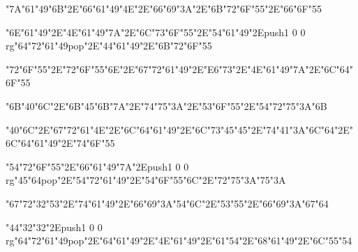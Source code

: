 \vfill\eject
\null\vfill
\centerline{\ipa\char"7A\ipa\char"61\ipa\char"49\ipa\char"6B\ipa\char"2E\ipa\char"66\ipa\char"61\ipa\char"49\ipa\char"4E\ipa\char"2E\ipa\char"66\ipa\char"69\ipa\char"3A\ipa\char"2E\ipa\char"6B\ipa\char"72\ipa\char"6F\ipa\char"55\ipa\char"2E\ipa\char"66\ipa\char"6F\ipa\char"55}\bigskip
\centerline{\ipa\char"6E\ipa\char"61\ipa\char"49\ipa\char"2E\ipa\char"4E\ipa\char"61\ipa\char"49\ipa\char"7A\ipa\char"2E\ipa\char"6C\ipa\char"73\ipa\char"6F\ipa\char"55\ipa\char"2E\ipa\char"54\ipa\char"61\ipa\char"49\ipa\char"2E\pdfcolorstack\match push{1 0 0 rg}\ipa\char"64\ipa\char"72\ipa\char"61\ipa\char"49\pdfcolorstack\match pop{}\ipa\char"2E\ipa\char"44\ipa\char"61\ipa\char"49\ipa\char"2E\ipa\char"6B\ipa\char"72\ipa\char"6F\ipa\char"55}\bigskip
\centerline{\ipa\char"72\ipa\char"6F\ipa\char"55\ipa\char"2E\ipa\char"72\ipa\char"6F\ipa\char"55\ipa\char"6E\ipa\char"2E\ipa\char"67\ipa\char"72\ipa\char"61\ipa\char"49\ipa\char"2E\ipa\char"E6\ipa\char"73\ipa\char"2E\ipa\char"4E\ipa\char"61\ipa\char"49\ipa\char"7A\ipa\char"2E\ipa\char"6C\ipa\char"64\ipa\char"6F\ipa\char"55}
\vfill\eject
\null\vfill
\centerline{\ipa\char"6B\ipa\char"40\ipa\char"6C\ipa\char"2E\ipa\char"6B\ipa\char"45\ipa\char"6B\ipa\char"7A\ipa\char"2E\ipa\char"74\ipa\char"75\ipa\char"3A\ipa\char"2E\ipa\char"53\ipa\char"6F\ipa\char"55\ipa\char"2E\ipa\char"54\ipa\char"72\ipa\char"75\ipa\char"3A\ipa\char"6B}\bigskip
\centerline{\ipa\char"40\ipa\char"6C\ipa\char"2E\ipa\char"67\ipa\char"72\ipa\char"61\ipa\char"4E\ipa\char"2E\ipa\char"6C\ipa\char"64\ipa\char"61\ipa\char"49\ipa\char"2E\ipa\char"6C\ipa\char"73\ipa\char"45\ipa\char"45\ipa\char"2E\ipa\char"74\ipa\char"41\ipa\char"3A\ipa\char"6C\ipa\char"64\ipa\char"2E\ipa\char"6C\ipa\char"64\ipa\char"61\ipa\char"49\ipa\char"2E\ipa\char"74\ipa\char"6F\ipa\char"55}\bigskip
\centerline{\ipa\char"54\ipa\char"72\ipa\char"6F\ipa\char"55\ipa\char"2E\ipa\char"66\ipa\char"61\ipa\char"49\ipa\char"7A\ipa\char"2E\pdfcolorstack\match push{1 0 0 rg}\ipa\char"45\ipa\char"64\pdfcolorstack\match pop{}\ipa\char"2E\ipa\char"54\ipa\char"72\ipa\char"61\ipa\char"49\ipa\char"2E\ipa\char"54\ipa\char"6F\ipa\char"55\ipa\char"6C\ipa\char"2E\ipa\char"72\ipa\char"75\ipa\char"3A\ipa\char"75\ipa\char"3A}
\vfill\eject
\null\vfill
\centerline{\ipa\char"67\ipa\char"72\ipa\char"32\ipa\char"53\ipa\char"2E\ipa\char"74\ipa\char"61\ipa\char"49\ipa\char"2E\ipa\char"66\ipa\char"69\ipa\char"3A\ipa\char"54\ipa\char"6C\ipa\char"2E\ipa\char"53\ipa\char"55\ipa\char"2E\ipa\char"66\ipa\char"69\ipa\char"3A\ipa\char"67\ipa\char"64}\bigskip
\centerline{\ipa\char"44\ipa\char"32\ipa\char"32\ipa\char"2E\pdfcolorstack\match push{1 0 0 rg}\ipa\char"64\ipa\char"72\ipa\char"61\ipa\char"49\pdfcolorstack\match pop{}\ipa\char"2E\ipa\char"64\ipa\char"61\ipa\char"49\ipa\char"2E\ipa\char"4E\ipa\char"61\ipa\char"49\ipa\char"2E\ipa\char"61\ipa\char"54\ipa\char"2E\ipa\char"68\ipa\char"61\ipa\char"49\ipa\char"2E\ipa\char"6C\ipa\char"55\ipa\char"54}\bigskip
